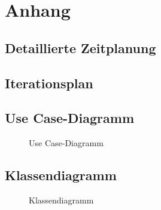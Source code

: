 \section{Anhang}
\subsection{Detaillierte Zeitplanung}
\label{app:Zeitplanung}



\clearpage


\clearpage

\subsection{Iterationsplan}
\label{app:Iterationsplan}


\clearpage

\subsection{Use Case-Diagramm}
\label{app:UseCase}
\begin{figure}[htb]
\centering
{}
\caption{Use Case-Diagramm}
\end{figure}


\clearpage


\clearpage


\clearpage

\clearpage

\subsection{Klassendiagramm}
\label{app:Klassendiagramm}
\begin{figure}[htb]
\centering
{}
\caption{Klassendiagramm}
\end{figure}
\clearpage
